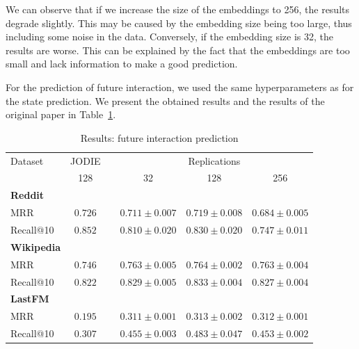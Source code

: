 We can observe that if we increase the size of the embeddings to 256, the results degrade slightly. This may be caused by the embedding size being too large, thus including some noise in the data. Conversely, if the embedding size is 32, the results are worse. This can be explained by the fact that the embeddings are too small and lack information to make a good prediction.

For the prediction of future interaction, we used the same hyperparameters as for the state prediction. We present the obtained results and the results of the original paper in Table~\ref{result-interaction}.

\begin{table}[htbp]
    \centering
    \begin{tabular}{@{}lccccc@{}}
    \toprule
    Dataset\hspace*{3em} & JODIE & \phantom{abc} & \multicolumn{3}{c}{Replications} \\
    \cmidrule{2-2} \cmidrule{4-6}
    & 128 && \multicolumn{1}{c}{32} & \multicolumn{1}{c}{128} & \multicolumn{1}{c}{256} \\
    \midrule
    \multicolumn{1}{l}{\hspace{-0.2cm}\textbf{Reddit}} \\
    {\quad \small MRR} & $\boldsymbol{0.726}$  && $0.711 \pm 0.007$ & $0.719 \pm 0.008$ & $0.684 \pm 0.005$ \\
    {\quad\small Recall@10}  &$\boldsymbol{0.852}$ && $0.810 \pm 0.020$ & $0.830 \pm 0.020$ & $0.747 \pm 0.011$\\
    \multicolumn{1}{l}{\hspace{-0.2cm}\textbf{Wikipedia}}\\
    {\quad\small MRR} &$0.746$ && $\boldsymbol{0.763} \pm 0.005$ & $\boldsymbol{0.764} \pm 0.002$ & $\boldsymbol{0.763} \pm 0.004$  \\
    {\quad\small Recall@10}  & $0.822$ && $\boldsymbol{0.829} \pm 0.005$ & $\boldsymbol{0.833} \pm 0.004$ & $\boldsymbol{0.827} \pm 0.004$\\
    \multicolumn{1}{l}{\hspace{-0.2cm}\textbf{LastFM}} \\
    {\quad\small MRR} &$0.195$ && $\boldsymbol{0.311} \pm 0.001$ & $\boldsymbol{0.313} \pm 0.002$ & $\boldsymbol{0.312} \pm 0.001$ \\
    {\quad\small Recall@10}  & $0.307$ && $\boldsymbol{0.455} \pm 0.003$ & $\boldsymbol{0.483} \pm 0.047$ & $\boldsymbol{0.453} \pm 0.002$\\
    \bottomrule
    \end{tabular}
    \caption{Results: future interaction prediction}
    \label{result-interaction}
\end{table}

